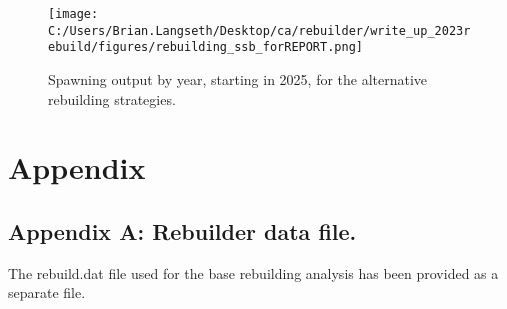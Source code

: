 \documentclass[11pt,
  letterpaper,
]{article}
\begin{document}
\begin{figure}
\centering
\texttt{[image: C:/Users/Brian.Langseth/Desktop/ca/rebuilder/write\_up\_2023rebuild/figures/rebuilding\_ssb\_forREPORT.png]}
\caption{Spawning output by year, starting in 2025, for the alternative rebuilding strategies.\label{fig:ssb-fig}}
\end{figure}

\clearpage

\clearpage

\hypertarget{appendix}{%
\section{Appendix}\label{appendix}}

\hypertarget{append_a}{%
\subsection{Appendix A: Rebuilder data file.}\label{append_a}}

The rebuild.dat file used for the base rebuilding analysis has been provided as a separate file.

\clearpage
\end{document}

